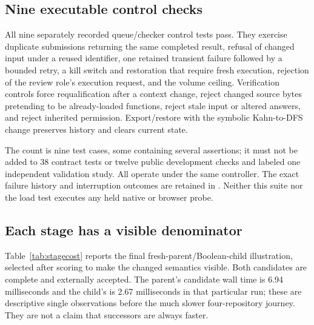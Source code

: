 \documentclass[11pt]{article}
\newcommand{\filename}[1]{\path{#1}}
\begin{document}
\subsection{Nine executable control checks}

All nine separately recorded queue/checker control tests pass. They exercise duplicate submissions returning the same completed result, refusal of changed input under a reused identifier, one retained transient failure followed by a bounded retry, a kill switch and restoration that require fresh execution, rejection of the review role's execution request, and the volume ceiling. Verification controls force requalification after a context change, reject changed source bytes pretending to be already-loaded functions, reject stale input or altered answers, and reject inherited permission. Export/restore with the symbolic Kahn-to-DFS change preserves history and clears current state.

The count is nine test cases, some containing several assertions; it must not be added to 38 contract tests or twelve public development checks and labeled one independent validation study. All operate under the same controller. The exact failure history and interruption outcomes are retained in \filename{study/results/control-tests.json}. Neither this suite nor the load test executes any held native or browser probe.

\subsection{Each stage has a visible denominator}

Table~\ref{tab:stagecost} reports the final fresh-parent/Boolean-child illustration, selected after scoring to make the changed semantics visible. Both candidates are complete and externally accepted. The parent's candidate wall time is 6.94 milliseconds and the child's is 2.67 milliseconds in that particular run; these are descriptive single observations before the much slower four-repository journey. They are not a claim that successors are always faster.
\end{document}
